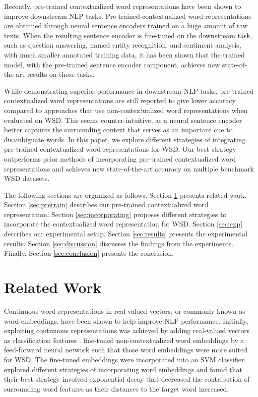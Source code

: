\documentclass[11pt,a4paper]{article}
\begin{document}
Recently, pre-trained contextualized word representations \cite{melamud_context2vec:_2016,mccann_learned_2017,peters_deep_2018,devlin_bert:_2019} have been shown to improve downstream NLP tasks. Pre-trained contextualized word representations are obtained through neural sentence encoders trained on a huge amount of raw texts. When the resulting sentence encoder is fine-tuned on the downstream task, such as question answering, named entity recognition, and sentiment analysis, with much smaller annotated training data, it has been shown that the trained model, with the pre-trained sentence encoder component, achieves new state-of-the-art results on those tasks.

While demonstrating superior performance in downstream NLP tasks, pre-trained contextualized word representations are still reported to give lower accuracy compared to approaches that use non-contextualized word representations \cite{melamud_context2vec:_2016,peters_deep_2018} when evaluated on WSD. This seems counter-intuitive, as a neural sentence encoder better captures the surrounding context that serves as an important cue to disambiguate words. In this paper, we explore different strategies of integrating pre-trained contextualized word representations for WSD. Our best strategy outperforms prior methods of incorporating pre-trained contextualized word representations and achieves new state-of-the-art accuracy on multiple benchmark WSD datasets.

The following sections are organized as follows. Section \ref{sec:related} presents related work. Section \ref{sec:pretrain} describes our pre-trained contextualized word representation. Section \ref{sec:incorporating} proposes different strategies to incorporate the contextualized word representation for WSD. Section \ref{sec:exp} describes our experimental setup. Section \ref{sec:results} presents the experimental results. Section \ref{sec:discussion} discusses the findings from the experiments. Finally, Section \ref{sec:conclusion} presents the conclusion.

\section{Related Work}
\label{sec:related}

Continuous word representations in real-valued vectors, or commonly known as word embeddings, have been shown to help improve NLP performance. Initially, exploiting continuous representations was achieved by adding real-valued vectors as classification features \cite{turian_word_2010}. \citet{taghipour_semi-supervised_2015} fine-tuned non-contextualized word embeddings by a feed-forward neural network such that those word embeddings were more suited for WSD. The fine-tuned embeddings were incorporated into an SVM classifier. \citet{iacobacci_embeddings_2016} explored different strategies of incorporating word embeddings and found that their best strategy involved exponential decay that decreased the contribution of surrounding word features as their distances to the target word increased.
\end{document}
